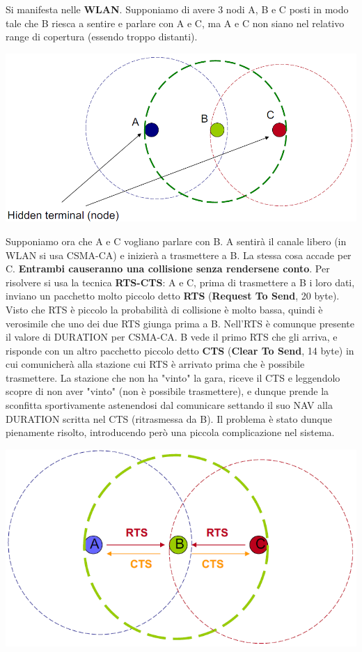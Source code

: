 \documentclass[12pt]{article}
\begin{document}
Si manifesta nelle \textbf{WLAN}. Supponiamo di avere 3 nodi A, B e C posti in modo tale che B riesca a sentire e parlare con A e C, ma A e C non siano nel relativo range di copertura (essendo troppo distanti).
\begin{center}
    \includegraphics[scale=0.5]{hidden_terminal_problem}
\end{center}
Supponiamo ora che A e C vogliano parlare con B. A sentirà il canale libero (in WLAN si usa CSMA-CA) e inizierà a trasmettere a B. La stessa cosa accade per C. \textbf{Entrambi causeranno una collisione senza rendersene conto}. Per risolvere si usa la tecnica \textbf{RTS-CTS}: A e C, prima di trasmettere a B i loro dati, inviano un pacchetto molto piccolo detto \textbf{RTS} (\textbf{Request To Send}, 20 byte). Visto che RTS è piccolo la probabilità di collisione è molto bassa, quindi è verosimile che uno dei due RTS giunga prima a B. Nell'RTS è comunque presente il valore di DURATION per CSMA-CA. B vede il primo RTS che gli arriva, e risponde con un altro pacchetto piccolo detto \textbf{CTS} (\textbf{Clear To Send}, 14 byte) in cui comunicherà alla stazione cui RTS è arrivato prima che è possibile trasmettere. La stazione che non ha "vinto" la gara, riceve il CTS e leggendolo scopre di non aver "vinto" (non è possibile trasmettere), e dunque prende la sconfitta sportivamente astenendosi dal comunicare settando il suo NAV alla DURATION scritta nel CTS (ritrasmessa da B). Il problema è stato dunque pienamente risolto, introducendo però una piccola complicazione nel sistema.
\begin{center}
    \includegraphics[scale=0.4]{hidden_terminal_problem_solution}
\end{center}
\end{document}
